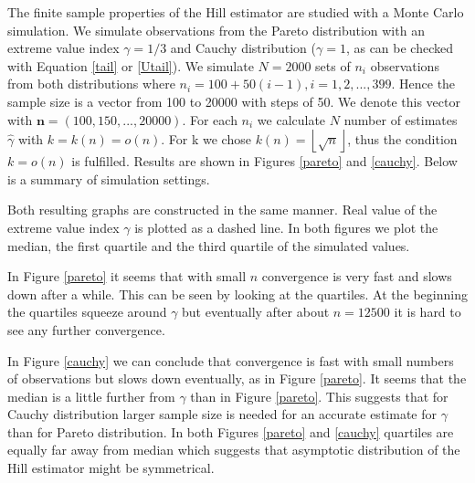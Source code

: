 \documentclass[english,12pt,a4paper,pdftex,sci,utf8]{aaltothesis} %
\begin{document}
The finite sample properties of the Hill estimator are studied with a Monte Carlo simulation. We simulate observations from the Pareto distribution with an extreme value index $\gamma=1/3$ and Cauchy distribution ($\gamma=1$, as can be checked with Equation \eqref{tail} or \eqref{Utail}). We simulate $N=2000$ sets of $n_i$ observations from both distributions where $n_i=100+50(i-1), i=1,2,...,399$. Hence the sample size is a vector from 100 to 20000 with steps of 50. We denote this vector with $\textbf{n}=(100,150,...,20000)$. For each $n_i$ we calculate $N$ number of estimates $\hat{\gamma}$ with $k=k(n)=o(n)$. For k we chose $k(n)=\left \lfloor \sqrt{n} \right \rfloor$, thus the condition $k=o(n)$ is fulfilled. Results are shown in Figures \ref{pareto} and \ref{cauchy}. Below is a summary of simulation settings.


Both resulting graphs are constructed in the same manner. Real value of the extreme value index $\gamma$  is plotted as a dashed line. In both figures we plot the median, the first quartile and the third quartile of the simulated values.

In Figure \ref{pareto} it seems that with small $n$ convergence is very fast and slows down after a while. This can be seen by looking at the quartiles. At the beginning the quartiles squeeze around $\gamma$ but eventually after about $n=12500$ it is hard to see any further convergence.

In Figure \ref{cauchy} we can conclude that convergence is fast with small numbers of observations but slows down eventually, as in Figure \ref{pareto}. It seems that the median is a little further from $\gamma$ than in Figure \ref{pareto}. This suggests that for Cauchy distribution larger sample size is needed for an accurate estimate for $\gamma$ than for Pareto distribution. In both Figures \ref{pareto} and \ref{cauchy} quartiles are equally far away from median which suggests that asymptotic distribution of the Hill estimator might be symmetrical.
\end{document}
